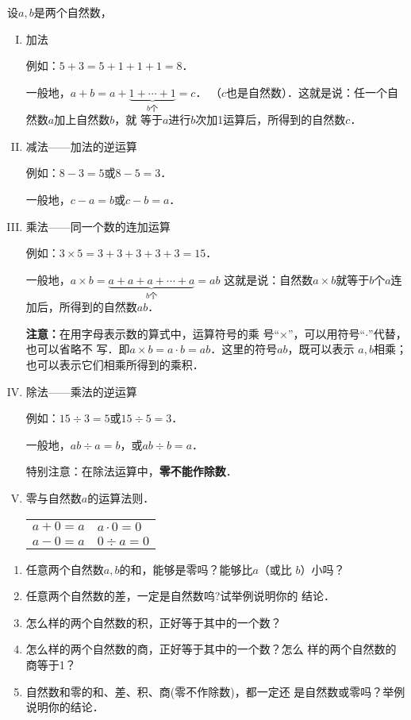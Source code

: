     设$a,b$是两个自然数，
\begin{enumerate}[I. ]
    \item 加法
    
    例如：$5+3=5+1+1+1=8$．

        一般地，$a+b=a+\underbrace{1 +\cdots +1}_{b\text{个}} =c$．  
        （$c$也是自然数）．这就是说：任一个自然数$a$加上自然数$b$，就
        等于$a$进行$b$次加1运算后，所得到的自然数$c$．
        \item 减法——加法的逆运算
        
    例如：$8-3=5$或$8-5=3$．

        一般地，$c-a=b$或$c-b=a$．
        \item 乘法——同一个数的连加运算
        
    例如：$3\times 5=3+3+3+3+3=15$．

    一般地，$a\times b =\underbrace{a+a+a+\cdots+a}_{b\text{个}}=ab$
 这就是说：自然数$a\times b$就等于$b$个$a$连加后，所得到的自然数$ab$．

 \textbf{注意：}在用字母表示数的算式中，运算符号的乘
    号“$\times$”，可以用符号“$\cdot$”代替，也可以省略不
    写．即$a\times b=a\cdot b=ab$．这里的符号$ab$，既可以表示
    $a,  b$相乘；也可以表示它们相乘所得到的乘积．

    \item 除法——乘法的逆运算

            例如：$15\div 3=5$或$15\div 5=3$．

            一般地，$ab\div a= b$，或$ab\div b = a$．

        特别注意：在除法运算中，\textbf{零不能作除数}．

        \item 零与自然数$a$的运算法则．
\begin{center}
    \begin{tabular}{ll}
        $a+0=a$& $a\cdot 0=0$\\
        $a-0=a$&  $0\div a=0$   
    \end{tabular}
\end{center}
       
\end{enumerate}         

\begin{ex}
\begin{enumerate}
    \item 任意两个自然数$a,b$的和，能够是零吗？能够比$a$（或比
    $b$）小吗？
    \item 任意两个自然数的差，一定是自然数呜?试举例说明你的
  结论．
  \item 怎么样的两个自然数的积，正好等于其中的一个数？
  \item 怎么样的两个自然数的商，正好等于其中的一个数？怎么
    样的两个自然数的商等于1？
    \item 自然数和零的和、差、积、商(零不作除数)，都一定还
    是自然数或零吗？举例说明你的结论．
  
\end{enumerate}
\end{ex}

